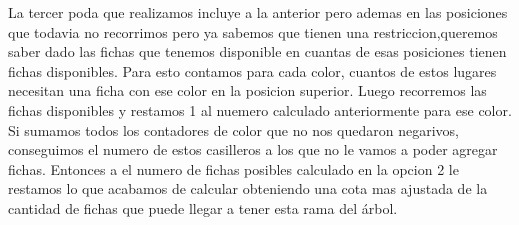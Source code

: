 La tercer poda que realizamos incluye a la anterior pero ademas en las posiciones que todavia no recorrimos pero ya sabemos que tienen una restriccion,queremos saber dado las fichas que tenemos disponible en cuantas de esas posiciones tienen fichas disponibles. Para esto contamos para cada color, cuantos de estos lugares necesitan una ficha con ese color en la posicion superior. Luego recorremos las fichas disponibles y restamos 1 al nuemero calculado anteriormente para ese color.
Si sumamos todos los contadores de color que no nos quedaron negarivos, conseguimos el numero de estos casilleros a los que no le vamos a poder agregar fichas. Entonces a el numero de fichas posibles calculado en la opcion 2 le restamos lo que acabamos de calcular obteniendo una cota mas ajustada de la cantidad de fichas que puede llegar a tener esta rama del árbol.